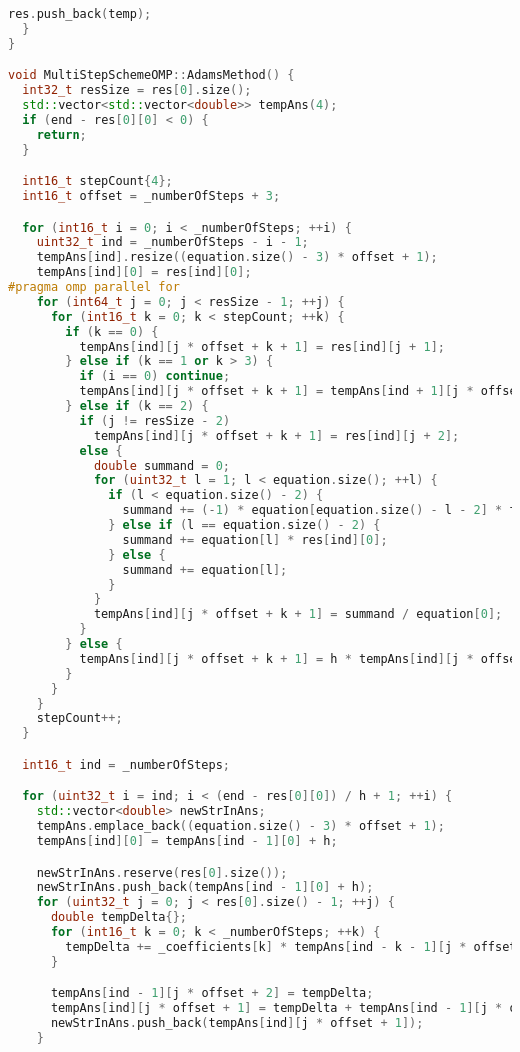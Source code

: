 \documentclass{report}
\begin{document}
\begin{lstlisting}[language=C++,caption=OpenMP версия]
    res.push_back(temp);
  }
}

void MultiStepSchemeOMP::AdamsMethod() {
  int32_t resSize = res[0].size();
  std::vector<std::vector<double>> tempAns(4);
  if (end - res[0][0] < 0) {
    return;
  }

  int16_t stepCount{4};
  int16_t offset = _numberOfSteps + 3;

  for (int16_t i = 0; i < _numberOfSteps; ++i) {
    uint32_t ind = _numberOfSteps - i - 1;
    tempAns[ind].resize((equation.size() - 3) * offset + 1);
    tempAns[ind][0] = res[ind][0];
#pragma omp parallel for
    for (int64_t j = 0; j < resSize - 1; ++j) {
      for (int16_t k = 0; k < stepCount; ++k) {
        if (k == 0) {
          tempAns[ind][j * offset + k + 1] = res[ind][j + 1];
        } else if (k == 1 or k > 3) {
          if (i == 0) continue;
          tempAns[ind][j * offset + k + 1] = tempAns[ind + 1][j * offset + k] - tempAns[ind][j * offset + k];
        } else if (k == 2) {
          if (j != resSize - 2)
            tempAns[ind][j * offset + k + 1] = res[ind][j + 2];
          else {
            double summand = 0;
            for (uint32_t l = 1; l < equation.size(); ++l) {
              if (l < equation.size() - 2) {
                summand += (-1) * equation[equation.size() - l - 2] * tempAns[ind][(l - 1) * offset + k - 1];
              } else if (l == equation.size() - 2) {
                summand += equation[l] * res[ind][0];
              } else {
                summand += equation[l];
              }
            }
            tempAns[ind][j * offset + k + 1] = summand / equation[0];
          }
        } else {
          tempAns[ind][j * offset + k + 1] = h * tempAns[ind][j * offset + k];
        }
      }
    }
    stepCount++;
  }

  int16_t ind = _numberOfSteps;

  for (uint32_t i = ind; i < (end - res[0][0]) / h + 1; ++i) {
    std::vector<double> newStrInAns;
    tempAns.emplace_back((equation.size() - 3) * offset + 1);
    tempAns[ind][0] = tempAns[ind - 1][0] + h;

    newStrInAns.reserve(res[0].size());
    newStrInAns.push_back(tempAns[ind - 1][0] + h);
    for (uint32_t j = 0; j < res[0].size() - 1; ++j) {
      double tempDelta{};
      for (int16_t k = 0; k < _numberOfSteps; ++k) {
        tempDelta += _coefficients[k] * tempAns[ind - k - 1][j * offset + 4 + k];
      }

      tempAns[ind - 1][j * offset + 2] = tempDelta;
      tempAns[ind][j * offset + 1] = tempDelta + tempAns[ind - 1][j * offset + 1];
      newStrInAns.push_back(tempAns[ind][j * offset + 1]);
    }


\end{lstlisting}
\end{document}

